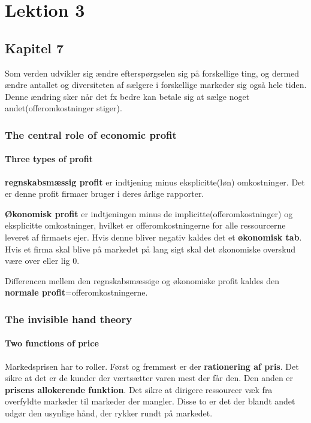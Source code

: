 \chapter{Lektion 3}
\section{Kapitel 7}
Som verden udvikler sig ændre efterspørgselen sig på forskellige ting, og dermed ændre antallet og diversiteten af sælgere i forskellige markeder sig også hele tiden. Denne ændring sker når det fx bedre kan betale sig at sælge noget andet(offeromkostninger stiger).

\subsection{The central role of economic profit}
\subsubsection{Three types of profit}
\textbf{regnskabsmæssig profit} er indtjening minus eksplicitte(løn) omkostninger. Det er denne profit firmaer bruger i deres årlige rapporter. 

\textbf{Økonomisk profit} er indtjeningen minus de implicitte(offeromkostninger) og eksplicitte omkostninger, hvilket er offeromkostningerne for alle ressourcerne leveret af firmaets ejer. Hvis denne bliver negativ kaldes det et \textbf{økonomisk tab}. Hvis et firma skal blive på markedet på lang sigt skal det økonomiske overskud være over eller lig 0.

Differencen mellem den regnskabsmæssige og økonomiske profit kaldes den \textbf{normale profit}=offeromkostningerne.

\subsection{The invisible hand theory}
\subsubsection{Two functions of price}
Markedsprisen har to roller. Først og fremmest er der \textbf{rationering af pris}. Det sikre at det er de kunder der værtsætter varen mest der får den. Den anden er \textbf{
prisens allokerende funktion}. Det sikre at dirigere ressourcer væk fra overfyldte markeder til markeder der mangler. Disse to er det der blandt andet udgør den usynlige hånd, der rykker rundt på markedet. 

